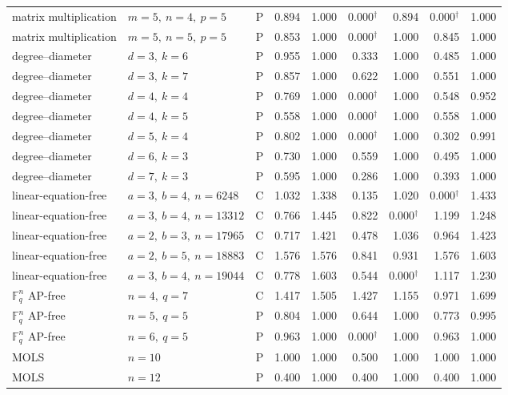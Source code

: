 \begin{longtable}{@{}P{.21\linewidth}P{.21\linewidth}rrrrrrr@{}}
matrix multiplication & $m=5,\ n=4,\ p=5$ & P & 0.894 & 1.000 & 0.000$^{\dagger}$ & 0.894 & 0.000$^{\dagger}$ & 1.000 \\
matrix multiplication & $m=5,\ n=5,\ p=5$ & P & 0.853 & 1.000 & 0.000$^{\dagger}$ & 1.000 & 0.845 & 1.000 \\
\addlinespace[2pt]
degree--diameter & $d=3,\ k=6$ & P & 0.955 & 1.000 & 0.333 & 1.000 & 0.485 & 1.000 \\
degree--diameter & $d=3,\ k=7$ & P & 0.857 & 1.000 & 0.622 & 1.000 & 0.551 & 1.000 \\
degree--diameter & $d=4,\ k=4$ & P & 0.769 & 1.000 & 0.000$^{\dagger}$ & 1.000 & 0.548 & 0.952 \\
degree--diameter & $d=4,\ k=5$ & P & 0.558 & 1.000 & 0.000$^{\dagger}$ & 1.000 & 0.558 & 1.000 \\
degree--diameter & $d=5,\ k=4$ & P & 0.802 & 1.000 & 0.000$^{\dagger}$ & 1.000 & 0.302 & 0.991 \\
degree--diameter & $d=6,\ k=3$ & P & 0.730 & 1.000 & 0.559 & 1.000 & 0.495 & 1.000 \\
degree--diameter & $d=7,\ k=3$ & P & 0.595 & 1.000 & 0.286 & 1.000 & 0.393 & 1.000 \\
\addlinespace[2pt]
linear-equation-free & $a=3,\ b=4,\ n=6248$ & C & 1.032 & 1.338 & 0.135 & 1.020 & 0.000$^{\dagger}$ & 1.433 \\
linear-equation-free & $a=3,\ b=4,\ n=13312$ & C & 0.766 & 1.445 & 0.822 & 0.000$^{\dagger}$ & 1.199 & 1.248 \\
linear-equation-free & $a=2,\ b=3,\ n=17965$ & C & 0.717 & 1.421 & 0.478 & 1.036 & 0.964 & 1.423 \\
linear-equation-free & $a=2,\ b=5,\ n=18883$ & C & 1.576 & 1.576 & 0.841 & 0.931 & 1.576 & 1.603 \\
linear-equation-free & $a=3,\ b=4,\ n=19044$ & C & 0.778 & 1.603 & 0.544 & 0.000$^{\dagger}$ & 1.117 & 1.230 \\
\addlinespace[2pt]
$\mathbb F_q^n$ AP-free & $n=4,\ q=7$ & C & 1.417 & 1.505 & 1.427 & 1.155 & 0.971 & 1.699 \\
$\mathbb F_q^n$ AP-free & $n=5,\ q=5$ & P & 0.804 & 1.000 & 0.644 & 1.000 & 0.773 & 0.995 \\
$\mathbb F_q^n$ AP-free & $n=6,\ q=5$ & P & 0.963 & 1.000 & 0.000$^{\dagger}$ & 1.000 & 0.963 & 1.000 \\
\addlinespace[2pt]
MOLS & $n=10$ & P & 1.000 & 1.000 & 0.500 & 1.000 & 1.000 & 1.000 \\
MOLS & $n=12$ & P & 0.400 & 1.000 & 0.400 & 1.000 & 0.400 & 1.000 \\

\end{longtable}
